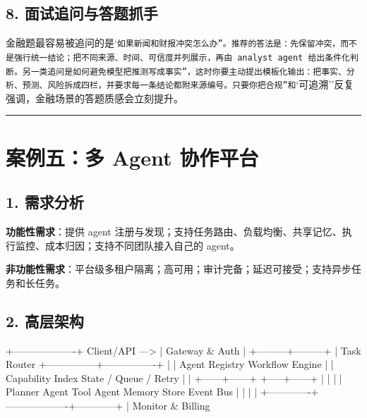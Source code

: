 \subsection{8. 面试追问与答题抓手}
金融题最容易被追问的是`\texttt{如果新闻和财报冲突怎么办''。推荐的答法是：先保留冲突，而不是强行统一结论；把不同来源、时间、可信度并列展示，再由 analyst agent 给出条件化判断。另一类追问是}\texttt{如何避免模型把推测写成事实''，这时你要主动提出模板化输出：把事实、分析、预测、风险拆成四栏，并要求每一条结论都附来源编号。只要你把}\texttt{合规''和}`可追溯''反复强调，金融场景的答题质感会立刻提升。


\bigskip\hrule\bigskip

\section{案例五：多 Agent 协作平台}

\subsection{1. 需求分析}
\textbf{功能性需求}：提供 agent 注册与发现；支持任务路由、负载均衡、共享记忆、执行监控、成本归因；支持不同团队接入自己的 agent。


\textbf{非功能性需求}：平台级多租户隔离；高可用；审计完备；延迟可接受；支持异步任务和长任务。


\subsection{2. 高层架构}
\begin{codeblock}
                +-------------------+
Client/API ---> | Gateway & Auth    |
                +---------+---------+
                          |
                    Task Router
          +---------------+----------------+
          |                                |
   Agent Registry                    Workflow Engine
          |                                |
  Capability Index                   State / Queue / Retry
          |                                |
   +------+------+                   +-----+------+
   |             |                   |            |
Planner Agent  Tool Agent        Memory Store  Event Bus
   |             |                   |            |
   +-------------+-------------------+------------+
                          |
                    Monitor & Billing
\end{codeblock}

